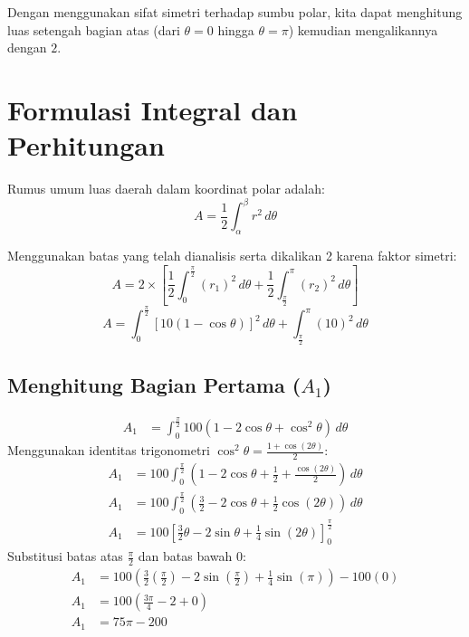 \documentclass[11pt,a4paper]{article}
\begin{document}
Dengan menggunakan sifat simetri terhadap sumbu polar, kita dapat menghitung luas setengah bagian atas (dari $\theta = 0$ hingga $\theta = \pi$) kemudian mengalikannya dengan $2$.

\section{Formulasi Integral dan Perhitungan}
Rumus umum luas daerah dalam koordinat polar adalah:
\begin{equation}
  A = \frac{1}{2} \int_{\alpha}^{\beta} r^2 \, d\theta
\end{equation}

Menggunakan batas yang telah dianalisis serta dikalikan 2 karena faktor simetri:
\begin{equation}
  A = 2 \times \left[ \frac{1}{2} \int_{0}^{\frac{\pi}{2}} (r_1)^2 \, d\theta + \frac{1}{2} \int_{\frac{\pi}{2}}^{\pi} (r_2)^2 \, d\theta \right]
\end{equation}
\begin{equation}
  A = \int_{0}^{\frac{\pi}{2}} \left[10(1 - \cos\theta)\right]^2 \, d\theta + \int_{\frac{\pi}{2}}^{\pi} (10)^2 \, d\theta
\end{equation}

\subsection{Menghitung Bagian Pertama ($A_1$)}
\begin{align*}
  A_1 &= \int_{0}^{\frac{\pi}{2}} 100(1 - 2\cos\theta + \cos^2\theta) \, d\theta
\end{align*}
Menggunakan identitas trigonometri $\cos^2\theta = \frac{1 + \cos(2\theta)}{2}$:
\begin{align*}
  A_1 &= 100 \int_{0}^{\frac{\pi}{2}} \left( 1 - 2\cos\theta + \frac{1}{2} + \frac{\cos(2\theta)}{2} \right) \, d\theta \\
  A_1 &= 100 \int_{0}^{\frac{\pi}{2}} \left( \frac{3}{2} - 2\cos\theta + \frac{1}{2}\cos(2\theta) \right) \, d\theta \\
  A_1 &= 100 \left[ \frac{3}{2}\theta - 2\sin\theta + \frac{1}{4}\sin(2\theta) \right]_{0}^{\frac{\pi}{2}}
\end{align*}
Substitusi batas atas $\frac{\pi}{2}$ dan batas bawah $0$:
\begin{align*}
  A_1 &= 100 \left( \frac{3}{2}\left(\frac{\pi}{2}\right) - 2\sin\left(\frac{\pi}{2}\right) + \frac{1}{4}\sin(\pi) \right) - 100(0) \\
  A_1 &= 100 \left( \frac{3\pi}{4} - 2 + 0 \right) \\
  A_1 &= 75\pi - 200
\end{align*}
\end{document}
